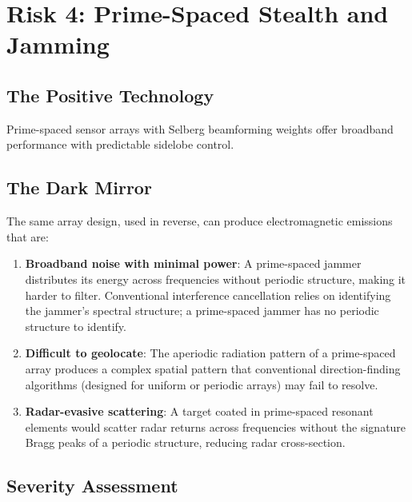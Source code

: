 \documentclass[11pt,a4paper]{article}
\begin{document}
\section{Risk 4: Prime-Spaced Stealth and Jamming}
\label{sec:stealth}

\subsection{The Positive Technology}

Prime-spaced sensor arrays with Selberg beamforming weights offer
broadband performance with predictable sidelobe control.

\subsection{The Dark Mirror}

The same array design, used in reverse, can produce electromagnetic
emissions that are:

\begin{enumerate}
  \item \textbf{Broadband noise with minimal power}: A prime-spaced
    jammer distributes its energy across frequencies without
    periodic structure, making it harder to filter. Conventional
    interference cancellation relies on identifying the jammer's
    spectral structure; a prime-spaced jammer has no periodic
    structure to identify.

  \item \textbf{Difficult to geolocate}: The aperiodic radiation
    pattern of a prime-spaced array produces a complex spatial
    pattern that conventional direction-finding algorithms
    (designed for uniform or periodic arrays) may fail to resolve.

  \item \textbf{Radar-evasive scattering}: A target coated in
    prime-spaced resonant elements would scatter radar returns
    across frequencies without the signature Bragg peaks of a
    periodic structure, reducing radar cross-section.
\end{enumerate}

\subsection{Severity Assessment}
\end{document}
